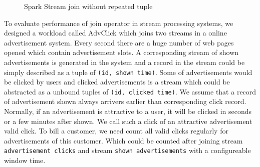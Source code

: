 \begin{figure}
  \begin{center}
   \caption{Spark Stream join without repeated tuple}
   \label{fig:spark_join_norepeat}
  \end{center}
\end{figure}


To evaluate performance of join operator in stream processing systems, we designed a workload called AdvClick which joins two streams in a online advertisement system. Every second there are a huge number of web pages opened which contain advertisement slots. A corresponding stream of shown advertisements is generated in the system and a record in the stream could be simply described as a tuple of \texttt{(id, shown time)}. Some of advertisements would be clicked by users and clicked advertisements is a stream which could be abstracted as a unbound tuples of \texttt{(id, clicked time)}. We assume that a record of advertisement shown always arrivers earlier than corresponding click record. Normally, if an advertisement is attractive to a user, it will be clicked in seconds or a few minutes after shown. We call such a click of an attractive advertisement valid click. To bill a customer, we need count all valid clicks regularly for advertisements of this customer. Which could be counted after joining stream \texttt{advertisement clicks} and stream \texttt{shown advertisements} with a configureable window time. 

